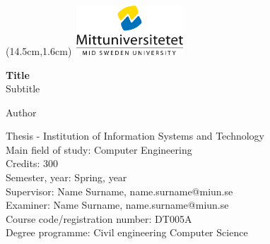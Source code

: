 \documentclass[12pt,a4paper]{report}
\begin{document}

{\sffamily
{}
\begin{titlepage}
{
\begin{textblock*}{13cm}(14.5cm,1.6cm) %
\includegraphics[width=4.1cm,height=1.85cm]{Illustrations/miun-mini-logo.png}
\end{textblock*}
}
\vspace*{9ex}
\noindent\Large{\textbf{Title}}\\

\vspace*{-1ex}
\hspace{-2ex}\normalsize{Subtitle}\\
\vspace{3.5ex}

\hspace{-2.7ex}\normalsize{Author}\\
\vspace{56ex}

\scriptsize{
\noindent\vspace*{0.6ex}
Thesis - Institution of Information Systems and Technology\\\vspace*{0.6ex}
Main field of study: Computer Engineering\\\vspace*{0.6ex}
Credits: 300\\\vspace*{0.6ex}
Semester, year: Spring, year  \\\vspace*{0.6ex}
Supervisor: Name Surname, name.surname@miun.se\\\vspace*{0.6ex}
Examiner: Name Surname, name.surname@miun.se\\\vspace*{0.6ex}
Course code/registration number: DT005A\\\vspace*{0.5ex}
Degree programme: Civil engineering Computer Science\\
}
\end{titlepage}
\setcounter{page}{2}
\restoregeometry
\newpage
}
\pagestyle{fancy}
\fancyhead{}
\fancyhead[R]{\today}
\fancyfoot[C]{\vspace*{-0.1\baselineskip}\thepage}
\vspace*{0.1ex}
\end{document}
